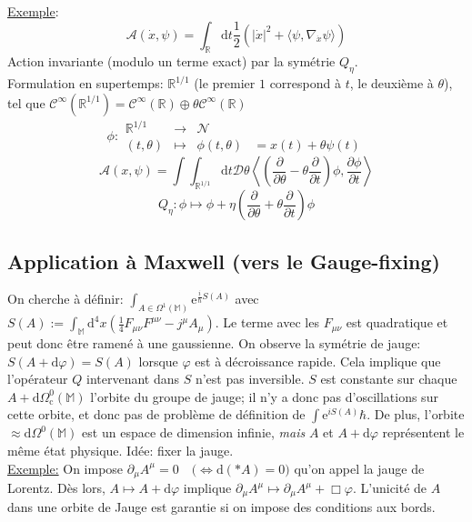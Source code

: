 \documentclass[a4paper,11pt]{article}
\renewcommand{\d}{{\mathrm{d}}}
\newcommand{\D}{{\mathcal{D}}}
\newcommand{\e}{{\mathrm{e}}}
\newcommand{\dr}[2]{\frac{\partial {#1}}{\partial{#2}}}
\begin{document}
\noindent \underline{Exemple}:
$$\mathcal{A}(\dot x, \psi) = \int_\mathbb{R}\d t \frac{1}{2}\left(|\dot x|^2 + \langle\psi,\nabla_{\dot x} \psi\rangle\right)$$
Action invariante (modulo un terme exact) par la symétrie $Q_\eta$.\\

\noindent Formulation en supertemps: $\mathbb{R}^{1/1}$ (le premier $1$ correspond à $t$, le deuxième à $\theta$), tel que $\mathcal{C}^\infty(\mathbb{R}^{1/1})=\mathcal{C}^\infty(\mathbb{R})\oplus\theta\mathcal{C}^\infty(\mathbb{R})$
$$\phi : \begin{matrix}
\mathbb{R}^{1/1} & \to & \mathcal{N}&\\
(t,\theta) & \mapsto & \phi(t,\theta) & = x(t) + \theta \psi(t)\end{matrix}$$
$$\mathcal{A}(x,\psi) = \int\int_{\mathbb{R}^{1/1}} \d t \D\theta \left\langle \left(\dr{} \theta - \theta \dr{} t\right) \phi, \dr\phi t\right\rangle$$
$$Q_\eta : \phi \mapsto \phi + \eta \left(\dr {} \theta + \theta \dr{} t\right)\phi$$

\subsection{Application à Maxwell (vers le Gauge-fixing)}
\quad On cherche à définir:
$\int_{A\in\Omega^1(\mathbb{M})}\e^{\frac i\hbar S(A)}$ avec $S(A):= \int_\mathbb{M} \d^4x \left(\frac{1}{4}F_{\mu\nu}F^{\mu\nu}-j^\mu A_\mu \right)$. Le terme avec les $F_{\mu\nu}$ est quadratique et peut donc être ramené à une gaussienne. On observe la symétrie de jauge: $S(A+\d \varphi) = S(A)$ lorsque $\varphi$ est à décroissance rapide. Cela implique que l'opérateur $Q$ intervenant dans $S$ n'est pas inversible. $S$ est constante sur chaque $A+\d \Omega^{0}_\mathrm{c}(\mathbb{M})$ l'orbite du groupe de jauge; il n'y a donc pas d'oscillations sur cette orbite, et donc pas de problème de définition de $\int \e^{iS(A)}\hbar$. De plus, l'orbite $\approx \d \Omega^{0}(\mathbb{M})$ est un espace de dimension infinie, \emph{mais} $A$ et $A+\d \varphi$ représentent le même état physique. Idée: fixer la jauge.\\

\noindent \underline{Exemple:} On impose $\partial_\mu A^\mu = 0\quad\Big(\iff \d(*A)=0\Big)$ qu'on appel la jauge de Lorentz. Dès lors, $A\mapsto A+\d \varphi$ implique $\partial_\mu A^\mu \mapsto\partial_\mu A^{\mu} + \Box \varphi$. L'unicité de $A$ dans une orbite de Jauge est garantie si on impose des conditions aux bords.\\
\end{document}
